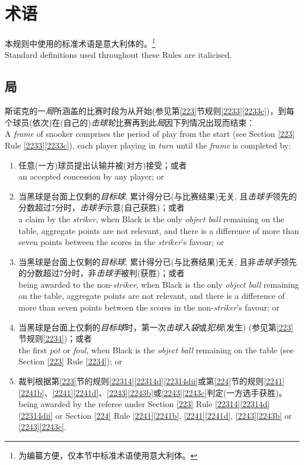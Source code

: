 \section{术语}\label{222}

\noindent 本规则中使用的标准术语是意大利体的。\footnote{为编纂方便，仅本节中标准术语使用意大利体。}\\
Standard definitions used throughout these Rules are italicised.

\subsection{局}\label{2221}

\noindent 斯诺克的一\emph{局}所涵盖的比赛时段为从开始(参见第\ref{223}节规则\ref{2233}\ref{2233c})，到每个球员(依次)在(自己的)\emph{击球轮}比赛再到此\emph{局}因下列情况出现而结束：\\
A \emph{frame} of snooker comprises the period of play from the start (see Section \ref{223} Rule \ref{2233}\ref{2233c}), each player playing in \emph{turn} until the \emph{frame} is completed by:
\begin{enumerate}[label=(\alph*)]
    \item 任意(一方)球员提出认输并被(对方)接受；或者\\
    an accepted concession by any player; or
    \item 当黑球是台面上仅剩的\emph{目标球}, 累计得分已(与比赛结果)无关, 且\emph{击球手}领先的分数超过7分时，\emph{击球手}示意(自己获胜)；或者\\
    a claim by the \emph{striker}, when Black is the only \emph{object ball} remaining on the table, aggregate points are not relevant, and there is a difference of more than seven points between the scores in the \emph{striker}'s favour; or
    \item 当黑球是台面上仅剩的\emph{目标球}, 累计得分已(与比赛结果)无关, 且非\emph{击球手}领先的分数超过7分时，非\emph{击球手}被判(获胜)；或者\\
    being awarded to the non-\emph{striker}, when Black is the only \emph{object ball} remaining on the table, aggregate points are not relevant, and there is a difference of more than seven points between the scores in the non-\emph{striker}'s favour; or
    \item 当黑球是台面上仅剩的\emph{目标球}时，第一次\emph{击球入袋}或\emph{犯规}(发生) (参见第\ref{223}节规则\ref{2234})；或者\\
    the first \emph{pot} or \emph{foul}, when Black is the \emph{object ball} remaining on the table (see Section \ref{223} Rule \ref{2234}); or
    \item 裁判根据第\ref{223}节的规则\ref{22314}\ref{22314d}\ref{22314dii}或第\ref{224}节的规则\ref{2241}\ref{2241b}、\ref{2241}\ref{2241d}、\ref{2243}\ref{2243b}或\ref{2243}\ref{2243c}判定(一方选手获胜)。\\
    being awarded by the referee under Section \ref{223} Rule \ref{22314}\ref{22314d} \ref{22314dii} or Section \ref{224} Rule \ref{2241}\ref{2241b}, \ref{2241}\ref{2241d}, \ref{2243}\ref{2243b} or \ref{2243}\ref{2243c}.
\end{enumerate}

